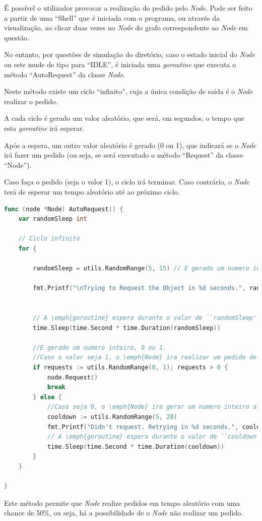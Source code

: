 É possível o utilizador provocar a realização do pedido pelo \emph{Node}. Pode ser feito a partir de uma 
``Shell'' que é iniciada com o programa,
ou através da visualização, ao clicar duas vezes no \emph{Node} do grafo correspondente ao \emph{Node} em questão.

No entanto, por questões de simulação do diretório, caso o estado inicial do \emph{Node}
ou este mude de tipo para ``IDLE'', 
é iniciada uma \emph{goroutine} que executa o método ``AutoRequest'' da classe \emph{Node}.

Neste método existe um ciclo ``infinito'', cuja a única condição de saída é o \emph{Node} realizar o pedido.

A cada ciclo é gerado um valor aleatório, que será, em segundos, o tempo que esta \emph{goroutine} irá esperar.

Após a espera, um outro valor aleatório é gerado (0 ou 1),
que indicará se o \emph{Node} irá fazer um pedido (ou seja, se será executado o método ``Request'' da classe ``Node'').


Caso faça o pedido (seja o valor 1), o ciclo irá terminar.
Caso contrário, o \emph{Node} terá de esperar um tempo aleatório até ao próximo ciclo.

\begin{lstlisting}[caption={Método ``AutoRequest''},language=Go]
func (node *Node) AutoRequest() {
	var randomSleep int

	// Ciclo infinito
	for {

		randomSleep = utils.RandomRange(5, 15) // E gerado um numero inteiro aleatorio entre 5 e 15

		fmt.Printf("\nTrying to Request the Object in %d seconds.", randomSleep)


		// A \emph{goroutine} espera durante o valor de ``randomSleep'' (em segundos)
		time.Sleep(time.Second * time.Duration(randomSleep))

		//E gerado um numero inteiro, 0 ou 1.
		//Caso o valor seja 1, o \emph{Node} ira realizar um pedido de acesso e o ciclo termina
		if requests := utils.RandomRange(0, 1); requests > 0 {
			node.Request()
			break
		} else {
			//Caso seja 0, o \emph{Node} ira gerar um numero inteiro aleatorio entre 5 e 20
			cooldown := utils.RandomRange(5, 20)
			fmt.Printf("Didn't request. Retrying in %d seconds.", cooldown)
			// A \emph{goroutine} espera durante o valor de ``cooldown'' (em segundos)
			time.Sleep(time.Second * time.Duration(cooldown))
		}
	}

}
\end{lstlisting}
Este método permite que \emph{Node} realize pedidos em tempo aleatório com uma chance de 50\%,
ou seja, há a possibilidade de o \emph{Node} não realizar um pedido.



